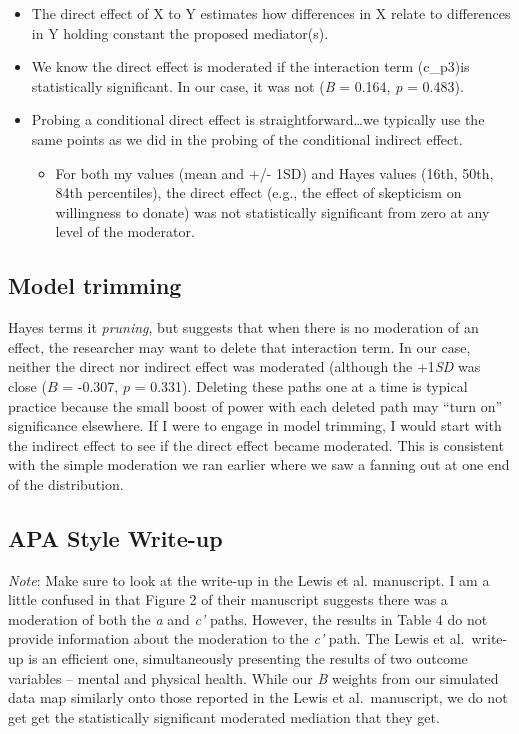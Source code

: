 \documentclass[
]{book}
\providecommand{\tightlist}{%
  \setlength{\itemsep}{0pt}\setlength{\parskip}{0pt}}
\begin{document}
\begin{itemize}
\tightlist
\item
  The direct effect of X to Y estimates how differences in X relate to differences in Y holding constant the proposed mediator(s).
\item
  We know the direct effect is moderated if the interaction term (c\_p3)is statistically significant. In our case, it was not (\emph{B} = 0.164, \emph{p} = 0.483).
\item
  Probing a conditional direct effect is straightforward\ldots we typically use the same points as we did in the probing of the conditional indirect effect.

  \begin{itemize}
  \tightlist
  \item
    For both my values (mean and +/- 1SD) and Hayes values (16th, 50th, 84th percentiles), the direct effect (e.g., the effect of skepticism on willingness to donate) was not statistically significant from zero at any level of the moderator.
  \end{itemize}
\end{itemize}

\hypertarget{model-trimming}{%
\subsection{Model trimming}\label{model-trimming}}

Hayes terms it \emph{pruning}, but suggests that when there is no moderation of an effect, the researcher may want to delete that interaction term. In our case, neither the direct nor indirect effect was moderated (although the +1\emph{SD} was close (\(B\) = -0.307, \(p\) = 0.331). Deleting these paths one at a time is typical practice because the small boost of power with each deleted path may ``turn on'' significance elsewhere. If I were to engage in model trimming, I would start with the indirect effect to see if the direct effect became moderated. This is consistent with the simple moderation we ran earlier where we saw a fanning out at one end of the distribution.

\hypertarget{apa-style-write-up-1}{%
\subsection{APA Style Write-up}\label{apa-style-write-up-1}}

\emph{Note}: Make sure to look at the write-up in the Lewis et al. \citep{lewis_applying_2017} manuscript. I am a little confused in that Figure 2 of their manuscript suggests there was a moderation of both the \emph{a} and \emph{c'} paths. However, the results in Table 4 do not provide information about the moderation to the \emph{c'} path. The Lewis et al.~write-up is an efficient one, simultaneously presenting the results of two outcome variables -- mental and physical health. While our \emph{B} weights from our simulated data map similarly onto those reported in the Lewis et al.~manuscript, we do not get get the statistically significant moderated mediation that they get.
\end{document}
